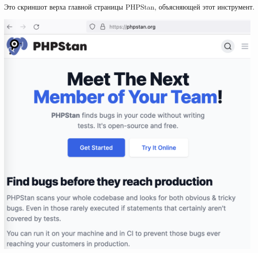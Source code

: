 
Это скриншот верха главной страницы PHPStan, объясняющей этот инструмент.

\begin{center}
    \includegraphics[width=35em]{phpstan-home}
\end{center}

\pagebreak
